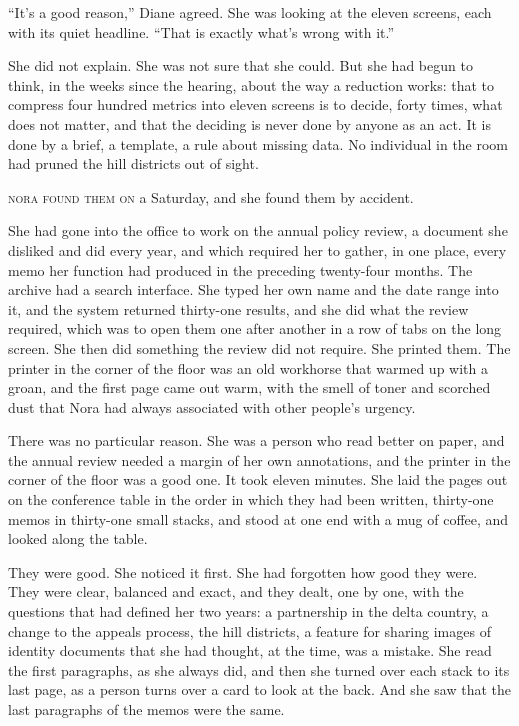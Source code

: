 ``It's a good reason,'' Diane agreed. She was looking at the eleven screens, each with its quiet headline. ``That is exactly what's wrong with it.''

She did not explain. She was not sure that she could. But she had begun to think, in the weeks since the hearing, about the way a reduction works: that to compress four hundred metrics into eleven screens is to decide, forty times, what does not matter, and that the deciding is never done by anyone as an act. It is done by a brief, a template, a rule about missing data. No individual in the room had pruned the hill districts out of sight.


\textsc{nora found them on} a Saturday, and she found them by accident.

She had gone into the office to work on the annual policy review, a document she disliked and did every year, and which required her to gather, in one place, every memo her function had produced in the preceding twenty-four months. The archive had a search interface. She typed her own name and the date range into it, and the system returned thirty-one results, and she did what the review required, which was to open them one after another in a row of tabs on the long screen. She then did something the review did not require. She printed them. The printer in the corner of the floor was an old workhorse that warmed up with a groan, and the first page came out warm, with the smell of toner and scorched dust that Nora had always associated with other people's urgency.

There was no particular reason. She was a person who read better on paper, and the annual review needed a margin of her own annotations, and the printer in the corner of the floor was a good one. It took eleven minutes. She laid the pages out on the conference table in the order in which they had been written, thirty-one memos in thirty-one small stacks, and stood at one end with a mug of coffee, and looked along the table.

They were good. She noticed it first. She had forgotten how good they were. They were clear, balanced and exact, and they dealt, one by one, with the questions that had defined her two years: a partnership in the delta country, a change to the appeals process, the hill districts, a feature for sharing images of identity documents that she had thought, at the time, was a mistake. She read the first paragraphs, as she always did, and then she turned over each stack to its last page, as a person turns over a card to look at the back. And she saw that the last paragraphs of the memos were the same.

